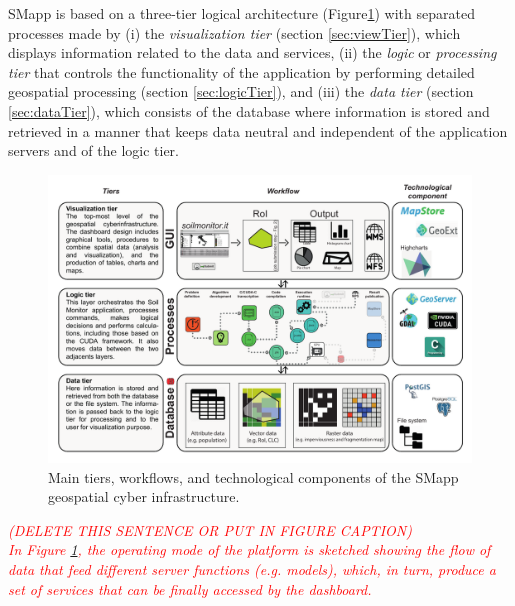 \documentclass[APA,LATO1COL,doublespace]{WileyNJD-v2}
\newcommand{\toberevised}[1]{\emph{\textcolor{red}{#1}}} %
\begin{document}
SMapp is based on a three-tier logical architecture (Figure\ref{fig:GCI}) with separated processes made by 
(i) the \textit{visualization tier} (section \ref{sec:viewTier}), which displays information related to the data and services, 
(ii) the \textit{logic} or \textit{processing tier} that controls the functionality of the application by performing detailed geospatial processing (section \ref{sec:logicTier}), and 
(iii) the \textit{data tier} (section \ref{sec:dataTier}), which consists of the database where information is stored and retrieved in a manner that keeps data neutral and independent of the application servers and of the logic tier.

\begin{figure}[t] %
    \centerline{\includegraphics[width=500pt]{Figure02.pdf}}
    \caption{Main tiers, workflows, and technological components of the SMapp geospatial cyber infrastructure.} \label{fig:GCI}
\end{figure}

\toberevised{(DELETE THIS SENTENCE OR PUT IN FIGURE CAPTION)\\
In Figure \ref{fig:GCI}, the operating mode of the platform is sketched  showing the flow of data that feed different server functions (e.g. models), which, in turn, produce a set of services that can be finally accessed by the dashboard.}
\end{document}
